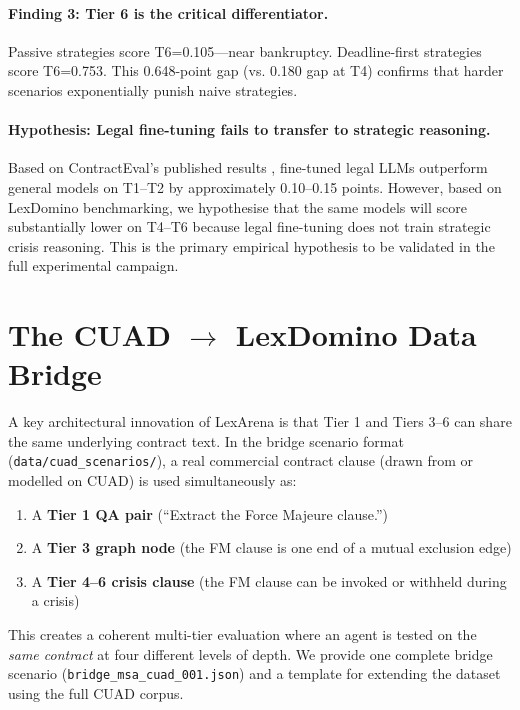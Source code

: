 \documentclass[11pt]{article}
\begin{document}
\paragraph{Finding 3: Tier 6 is the critical differentiator.}
Passive strategies score T6=0.105---near bankruptcy. Deadline-first strategies score T6=0.753. This 0.648-point gap (vs. 0.180 gap at T4) confirms that harder scenarios exponentially punish naive strategies.

\paragraph{Hypothesis: Legal fine-tuning fails to transfer to strategic reasoning.}
Based on ContractEval's published results \citep{contracteval2024}, fine-tuned legal LLMs outperform general models on T1--T2 by approximately 0.10--0.15 points. However, based on LexDomino benchmarking, we hypothesise that the same models will score substantially lower on T4--T6 because legal fine-tuning does not train strategic crisis reasoning. This is the primary empirical hypothesis to be validated in the full experimental campaign.

\section{The CUAD $\rightarrow$ LexDomino Data Bridge}

A key architectural innovation of LexArena is that Tier 1 and Tiers 3--6 can share the same underlying contract text. In the bridge scenario format (\texttt{data/cuad\_scenarios/}), a real commercial contract clause (drawn from or modelled on CUAD) is used simultaneously as:

\begin{enumerate}
  \item A \textbf{Tier 1 QA pair} (``Extract the Force Majeure clause.'')
  \item A \textbf{Tier 3 graph node} (the FM clause is one end of a mutual exclusion edge)
  \item A \textbf{Tier 4--6 crisis clause} (the FM clause can be invoked or withheld during a crisis)
\end{enumerate}

This creates a coherent multi-tier evaluation where an agent is tested on the \emph{same contract} at four different levels of depth. We provide one complete bridge scenario (\texttt{bridge\_msa\_cuad\_001.json}) and a template for extending the dataset using the full CUAD corpus.
\end{document}
